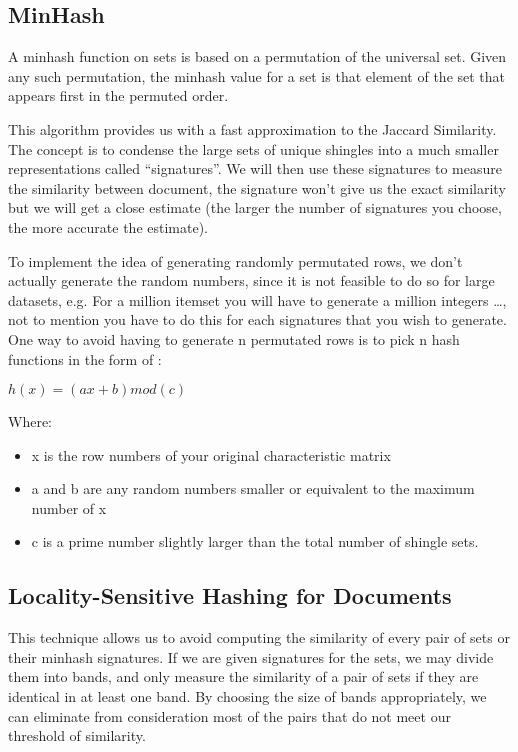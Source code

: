 \documentclass[12pt]{article}
\begin{document}
\subsection{MinHash}

A minhash function on sets is based on a permutation of the universal set. Given any such permutation, the minhash value for a set is that element of the set that appears first in the permuted order. 

This algorithm provides us with a fast approximation to the Jaccard Similarity. The concept is to condense the large sets of unique shingles into a much smaller representations called ``signatures''. We will then use these signatures to measure the similarity between document, the signature won't give us the exact similarity but we will get a close estimate (the larger the number of signatures you choose, the more accurate the estimate).
\\ \medskip


To implement the idea of generating randomly permutated rows, we don’t actually generate the random numbers, since it is not feasible to do so for large datasets, e.g. For a million itemset you will have to generate a million integers …, not to mention you have to do this for each signatures that you wish to generate. One way to avoid having to generate n permutated rows is to pick n hash functions in the form of :
\medbreak
\begin{center}
$ h(x)=(ax+b) mod(c)$
\end{center}

Where: 
\begin{itemize}
\item x is the row numbers of your original characteristic matrix
\item a and b are any random numbers smaller or equivalent to the maximum number of x 
\item c is a prime number slightly larger than the total number of shingle sets. 
\end{itemize}

\subsection{Locality-Sensitive Hashing for Documents}
 This technique allows us to avoid computing the similarity of every pair of sets or their minhash signatures. If we are given signatures for the sets, we may divide them into bands, and only measure the similarity of a pair of sets if they are identical in at least one band. By choosing the size of bands appropriately, we can eliminate from consideration most of the pairs that do not meet our threshold of similarity.
 \medskip 
 \\
\end{document}
